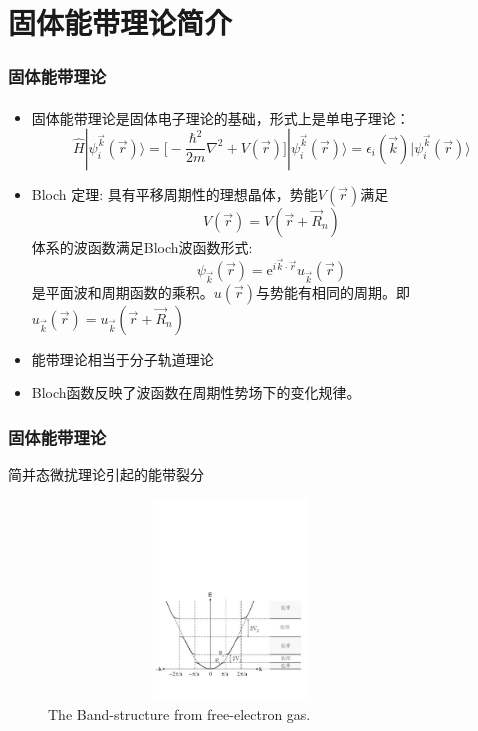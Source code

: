 \documentclass[cjk,slidestop,compress,mathserif,blue]{beamer}
\newcommand{\upcite}[1]{\hspace{0ex}\textsuperscript{\cite{#1}}} %
\begin{document}
\section{固体能带理论简介}       %
\frame
{
\frametitle{固体能带理论}
\begin{itemize}%
   \setlength{\itemsep}{10pt}
   \item 固体能带理论\upcite{Huang_Han}是固体电子理论的基础，形式上是单电子理论：
    $$\hat H |\psi_i^{\vec k}(\vec r)\rangle=\bigg[-\dfrac{\hbar^2}{2m}\nabla^2+V(\vec r)\bigg]|\psi_i^{\vec k}(\vec r)\rangle=\epsilon_i(\vec k)|\psi_i^{\vec k}(\vec r)\rangle$$
  \item \textrm{\large{Bloch 定理:}}
具有平移周期性的理想晶体，势能$V(\vec r)$满足$$V(\vec r)=V(\vec r+\vec R_n)$$
体系的波函数满足\textrm{Bloch}波函数形式:$$\psi_{\vec k}(\vec r)=\textrm{e}^{i\vec k\cdot\vec r}u_{\vec k}(\vec r)$$
是平面波和周期函数的乘积。$u(\vec r)$与势能有相同的周期。即$u_{\vec k}(\vec r)=u_{\vec k}(\vec r+\vec R_n)$
  \item 能带理论相当于分子轨道理论
\item \textrm{Bloch}函数反映了波函数在周期性势场下的变化规律。
\end{itemize}
}

\frame
{
\frametitle{固体能带理论}
简并态微扰理论引起的能带裂分
\begin{figure}[h!]
\centering
\includegraphics[height=2.1in,width=3.8in,viewport=10 90 570 380,clip]{Band_Gap.pdf}
\caption{\small \textrm{The Band-structure from free-electron gas.}}%
\label{Band-Structure-1}
\end{figure} 
}
\end{document}
